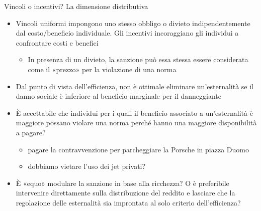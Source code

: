 \documentclass[aspectratio=64,11pt]{beamer}
\begin{document}
\begin{frame}{Vincoli o incentivi? La dimensione distributiva}
\begin{itemize}
\item Vincoli uniformi impongono uno stesso obbligo o divieto indipendentemente
dal costo/beneficio individuale. Gli incentivi incoraggiano gli individui a
confrontare costi e benefici
\begin{itemize}
\item In presenza di un divieto, la sanzione può essa stessa essere considerata
come il «prezzo» per la violazione di una norma
\end{itemize}
\item Dal punto di vista dell’efficienza, non è ottimale eliminare un’esternalità
se il danno sociale è inferiore al beneficio marginale per il danneggiante
\item È accettabile che individui per i quali il beneficio associato a
un’esternalità è maggiore possano violare una norma perché hanno una
maggiore disponibilità a pagare?
\begin{itemize}
\item pagare la contravvenzione per parcheggiare la Porsche in piazza Duomo
\item dobbiamo vietare l’uso dei jet privati?
\end{itemize}
\item È «equo» modulare la sanzione in base alla ricchezza? O è preferibile
intervenire direttamente sulla distribuzione del reddito e lasciare che la
regolazione delle esternalità sia improntata al solo criterio
dell’efficienza?
\end{itemize}
\end{frame}
\end{document}
